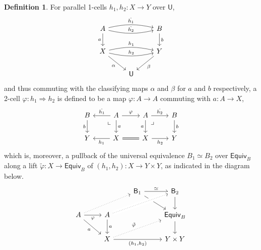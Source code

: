 \documentclass[12pt,reqno]{amsart}
\renewcommand{\to}{\ensuremath{\rightarrow}}
\newcommand{\T}{\ensuremath{\mathsf{U}}}
\newcommand{\pbcorner}{\arrow[dr,phantom,"\lrcorner" very near start, shift right=.5ex]} %
\newcommand{\pbcornerright}{\arrow[dl,phantom,"\llcorner" very near start, shift left=.5ex]} %
\theoremstyle{remark}
\theoremstyle{definition}
\newtheorem{definition}[theorem]{Definition}
\begin{document}
%
\begin{definition}\label{def:2cells}%
For parallel 1-cells $h_1, h_2 : X \to Y$ over $\T$,
\begin{equation}\label{eq:parallelclassifiedfamilies}
\begin{tikzcd}
	 A \ar[d,swap, "a"] \ar[rr,bend right = 3ex, "{\dot{h_2}}"]  \ar[rr,bend left  = 3ex, "{\dot{h_1}}"]  && B \ar[d, "b"] \\  
	 X \ar[rr,swap,bend right = 3ex,swap, "{h_2}"] \ar[rr,bend left  = 3ex, "{h_1}"]  \ar[rd,swap, "\alpha"] &&  \ar[ld, "\beta"]  Y\\
	&\T&
 \end{tikzcd}
 \end{equation}
and thus commuting with the classifying maps $\alpha$ and $\beta$ for $a$ and $b$ respectively, a 2-cell $\varphi : h_1 \Rightarrow h_2$ is defined to be a map $\varphi : A\to A$ commuting with $a : A \to X$,
\begin{equation}\label{eq:parallelclassifiedfamilies2}
\begin{tikzcd}
 B  \ar[d,swap, "b"] &  \ar[l,swap, "{\dot{h_1}}"] A \ar[r, "{\varphi}"] \ar[d, "a"] \pbcornerright & A \ar[d, swap, "a"]  \ar[r, "{\dot{h_2}}"]   \pbcorner & B \ar[d, "b"] \\  
 Y &  \ar[l, "{h_1}"]  X \ar[r, equals] & X \ar[r,swap, "{h_2}"] &  Y
 \end{tikzcd}
 \end{equation}
which is, moreover, a pullback of the universal equivalence $B_1\simeq B_2$ over $\mathsf{Equiv}_B$ along a lift $\tilde{\varphi} : X \to \mathsf{Equiv}_B$ of  $(h_1, h_2) : X \to Y \times Y$, as indicated in the diagram below.
\begin{equation}\label{diag:2celldef3}
\begin{tikzcd} 
	&& \mathsf{B}_1 \ar[rd]  \ar[r,"{\simeq}"]  & \mathsf{B}_2 \ar[d] \\  
A \ar[rd,swap, "a"] \ar[r,swap, "{\varphi}"]  \ar[rru, dotted] & A \ar[d, "a"] \ar[rru, crossing over, dotted] && \mathsf{Equiv}_B \ar[d] \\  
& X \ar[rru, dotted, "{\tilde{\varphi}}"] \ar[rr, swap, "{(h_1, h_2)}"] && Y \times Y
	 \end{tikzcd}
 \end{equation}
\end{definition}
\end{document}
